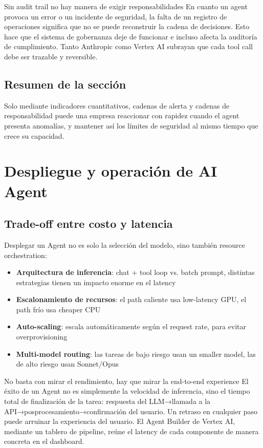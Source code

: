 \documentclass[a4paper]{article}
\begin{document}
\begin{warningbox}{Sin audit trail no hay manera de exigir responsabilidades}
En cuanto un agent provoca un error o un incidente de seguridad, la falta de un registro de operaciones significa que no se puede reconstruir la cadena de decisiones. Esto hace que el sistema de gobernanza deje de funcionar e incluso afecta la auditoría de cumplimiento. Tanto Anthropic como Vertex AI subrayan que cada tool call debe ser trazable y reversible.
\end{warningbox}

\subsection{Resumen de la sección}

Solo mediante indicadores cuantitativos, cadenas de alerta y cadenas de responsabilidad puede una empresa reaccionar con rapidez cuando el agent presenta anomalías, y mantener así los límites de seguridad al mismo tiempo que crece su capacidad.

\section{Despliegue y operación de AI Agent}

\subsection{Trade-off entre costo y latencia}

Desplegar un Agent no es solo la selección del modelo, sino también resource orchestration:

\begin{itemize}
    \item \textbf{Arquitectura de inferencia}: chat + tool loop vs. batch prompt, distintas estrategias tienen un impacto enorme en el latency
    \item \textbf{Escalonamiento de recursos}: el path caliente usa low-latency GPU, el path frío usa cheaper CPU
    \item \textbf{Auto-scaling}: escala automáticamente según el request rate, para evitar overprovisioning
    \item \textbf{Multi-model routing}: las tareas de bajo riesgo usan un smaller model, las de alto riesgo usan Sonnet/Opus
\end{itemize}

\begin{importantbox}{No basta con mirar el rendimiento, hay que mirar la end-to-end experience}
El éxito de un Agent no es simplemente la velocidad de inferencia, sino el tiempo total de finalización de la tarea: respuesta del LLM→llamada a la API→posprocesamiento→confirmación del usuario. Un retraso en cualquier paso puede arruinar la experiencia del usuario. El Agent Builder de Vertex AI, mediante un tablero de pipeline, reúne el latency de cada componente de manera concreta en el dashboard.
\end{importantbox}
\end{document}
